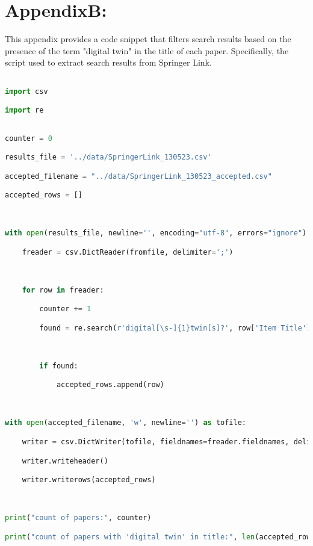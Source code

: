 
\chapter{AppendixB:  } %

\label{AppendixB} %

This appendix provides a code snippet that filters search results based on the presence of the term "digital twin" in the title of each paper. Specifically, the script used to extract search results from Springer Link. 


\begin{lstlisting}[language=Python, style=CStyle, caption={A python code snippet to identify papers which have "digital twin" in their title }, label={list:mainc-ascon}]

import csv

import re

 
counter = 0

results_file = '../data/SpringerLink_130523.csv'

accepted_filename = "../data/SpringerLink_130523_accepted.csv"

accepted_rows = []

 

with open(results_file, newline='', encoding="utf-8", errors="ignore") as fromfile:

    freader = csv.DictReader(fromfile, delimiter=';')

 

    for row in freader:

        counter += 1

        found = re.search(r'digital[\s-]{1}twin[s]?', row['Item Title'].lower())

 

        if found:

            accepted_rows.append(row)

 

with open(accepted_filename, 'w', newline='') as tofile:

    writer = csv.DictWriter(tofile, fieldnames=freader.fieldnames, delimiter=";")

    writer.writeheader()

    writer.writerows(accepted_rows)

 

print("count of papers:", counter)

print("count of papers with 'digital twin' in title:", len(accepted_rows))
\end{lstlisting}
